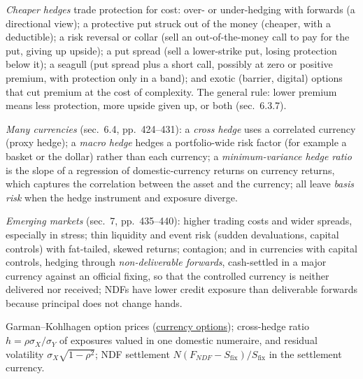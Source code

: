\begin{qfmethod}\label{meth:currency-hedge-cost-reduction}
 \emph{Cheaper hedges} \citep[chap.~8, sec.~6.3, pp.~416--423]{portfolio-management-in-practice-v1-2020} trade protection for cost: over- or under-hedging with forwards (a directional view); a protective put struck out of the money (cheaper, with a deductible); a risk reversal or collar (sell an out-of-the-money call to pay for the put, giving up upside); a put spread (sell a lower-strike put, losing protection below it); a seagull (put spread plus a short call, possibly at zero or positive premium, with protection only in a band); and exotic (barrier, digital) options that cut premium at the cost of complexity. The general rule: lower premium means less protection, more upside given up, or both (sec.~6.3.7).

\emph{Many currencies} (sec.~6.4, pp.~424--431): a \emph{cross hedge} uses a correlated currency (proxy hedge); a \emph{macro hedge} hedges a portfolio-wide risk factor (for example a basket or the dollar) rather than each currency; a \emph{minimum-variance hedge ratio} is the slope of a regression of domestic-currency returns on currency returns, which captures the correlation between the asset and the currency; all leave \emph{basis risk} when the hedge instrument and exposure diverge.

\emph{Emerging markets} (sec.~7, pp.~435--440): higher trading costs and wider spreads, especially in stress; thin liquidity and event risk (sudden devaluations, capital controls) with fat-tailed, skewed returns; contagion; and in currencies with capital controls, hedging through \emph{non-deliverable forwards}, cash-settled in a major currency against an official fixing, so that the controlled currency is neither delivered nor received; NDFs have lower credit exposure than deliverable forwards because principal does not change hands.

 Garman--Kohlhagen option prices (\hyperref[meth:black-model-rates-currencies]{currency options}); cross-hedge ratio $h=\rho\sigma_X/\sigma_Y$ of exposures valued in one domestic numeraire, and residual volatility $\sigma_X\sqrt{1-\rho^2}$; NDF settlement $N(F_{NDF}-S_{\text{fix}})/S_{\text{fix}}$ in the settlement currency.


\end{qfmethod}
